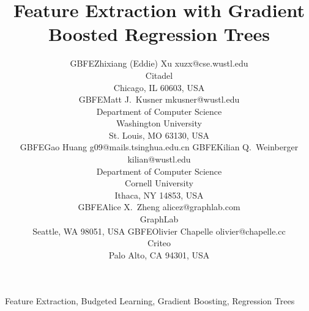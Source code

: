 \documentclass[twoside,11pt]{article}
\newcommand{\name}{GBFE}
\begin{document}
\title{Feature Extraction with Gradient Boosted Regression Trees}

\author{\name Zhixiang (Eddie) Xu \email xuzx@cse.wustl.edu \\
       \addr Citadel\\
       Chicago, IL 60603, USA\\
       \AND
       \name Matt J.\ Kusner \email mkusner@wustl.edu \\
       \addr Department of Computer Science\\
       Washington University\\
       St. Louis, MO 63130, USA\\
       \AND
       \name Gao Huang \email g09@mails.tsinghua.edu.cn
       \AND
       \name Kilian Q.\ Weinberger \email kilian@wustl.edu \\
       \addr Department of Computer Science\\
       Cornell University\\
       Ithaca, NY 14853, USA\\
       \AND
       \name Alice X.\ Zheng \email alicez@graphlab.com \\
       \addr GraphLab\\
       Seattle, WA 98051, USA
	   \AND
       \name Olivier Chapelle \email olivier@chapelle.cc \\
       \addr Criteo\\
       Palo Alto, CA 94301, USA}	   
	   
	   



\maketitle

\begin{abstract}%

\end{abstract}

\begin{keywords}
  Feature Extraction, Budgeted Learning, Gradient Boosting, Regression Trees
\end{keywords}
\end{document}
